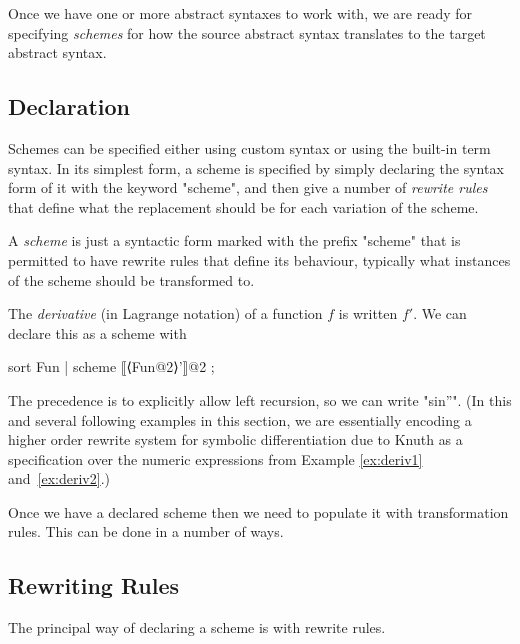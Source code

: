 \documentclass[11pt]{article} %
\begin{document}
Once we have one or more abstract syntaxes to work with, we are ready for specifying \emph{schemes}
for how the source abstract syntax translates to the target abstract syntax.

\subsection{Declaration}

Schemes can be specified either using custom syntax or using the built-in term syntax. In its
simplest form, a scheme is specified by simply declaring the syntax form of it with the keyword
"scheme", and then give a number of \emph{rewrite rules} that define what the replacement
should be for each variation of the scheme.

\begin{notation}\label{nota:scheme}
  A \emph{scheme} is just a syntactic form marked with the prefix "scheme" that is permitted to have
  rewrite rules that define its behaviour, typically what instances of the scheme should be
  transformed to.
\end{notation}


\begin{example}\label{ex:deriv3}
  The \emph{derivative} (in Lagrange notation) of a function $f$ is written $f'$. We can declare
  this as a scheme with
\begin{code}
sort Fun | scheme ⟦⟨Fun@2⟩'⟧@2 ;
\end{code}
  The precedence is to explicitly allow left recursion, so we can write "sin''".
  (In this and several following examples in this section, we are essentially encoding a higher
  order rewrite system for symbolic differentiation due to Knuth \cite[p.337]{Knuth:1973:TAOCP} as a
  \HAX specification over the numeric expressions from Example \ref{ex:deriv1}
  and~\ref{ex:deriv2}.)
\end{example}

Once we have a declared scheme then we need to populate it with transformation rules. This can be
done in a number of ways.

\subsection{Rewriting Rules}

The principal way of declaring a scheme is with rewrite rules.
\end{document}
